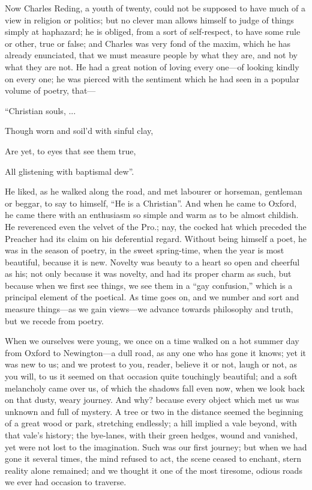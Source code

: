 Now Charles Reding, a youth of twenty, could not be supposed to
have much of a view in religion or politics; but no clever man allows
himself to judge of things simply at haphazard; he is obliged, from a
sort of self-respect, to have some rule or other, true or false; and
Charles was very fond of the maxim, which he has already enunciated,
that we must measure people by what they are, and not by what they are
not. He had a great notion of loving every one—of looking kindly on
every one; he was pierced with the sentiment which he had seen in a
popular volume of poetry, that—

``Christian souls, ...

Though worn and soil'd with sinful clay,

Are yet, to eyes that see them true,

All glistening with baptismal dew''.

He liked, as he walked along the road, and met labourer or
horseman, gentleman or beggar, to say to himself, ``He is a
Christian''. And when he came to Oxford, he came there with an
enthusiasm so simple and warm as to be almost childish. He reverenced
even the velvet of the Pro.; nay, the cocked hat which preceded the
Preacher had its claim on his deferential regard. Without being
himself a poet, he was in the season of poetry, in the sweet
spring-time, when the year is most beautiful, because it is new.
Novelty was beauty to a heart so open and cheerful as his; not only
because it was novelty, and had its proper charm as such, but because
when we first see things, we see them in a ``gay
confusion,'' which is a principal element of the poetical. As time
goes on, and we number and sort and measure things—as we gain views—we
advance towards philosophy and truth, but we recede from poetry.

When we ourselves were young, we once on a time walked on a hot
summer day from Oxford to Newington—a dull road, as any one who has
gone it knows; yet it was new to us; and we protest to you, reader,
believe it or not, laugh or not, as you will, to us it seemed on that
occasion quite touchingly beautiful; and a soft melancholy came over
us, of which the shadows fall even now, when we look back on that
dusty, weary journey. And why? because every object which met us was
unknown and full of mystery. A tree or two in the distance seemed the
beginning of a great wood or park, stretching endlessly; a hill
implied a vale beyond, with that vale's history; the bye-lanes, with
their green hedges, wound and vanished, yet were not lost to the
imagination. Such was our first journey; but when we had gone it
several times, the mind refused to act, the scene ceased to enchant,
stern reality alone remained; and we thought it one of the most
tiresome, odious roads we ever had occasion to traverse.


